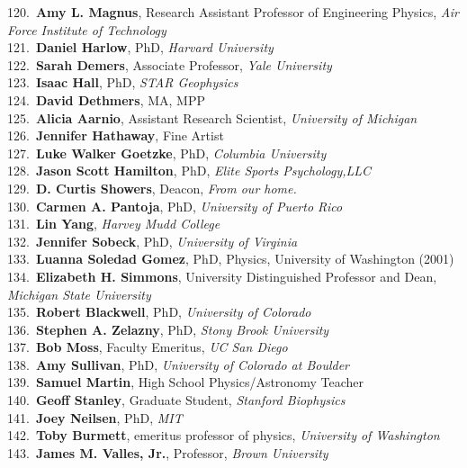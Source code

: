 120.~{\bf Amy L. Magnus}, Research Assistant Professor of Engineering Physics, {\sl Air Force Institute of Technology} \\
121.~{\bf Daniel Harlow}, PhD, {\sl Harvard University} \\
122.~{\bf Sarah Demers}, Associate Professor, {\sl Yale University} \\
123.~{\bf Isaac Hall}, PhD, {\sl STAR Geophysics} \\
124.~{\bf David Dethmers}, MA, MPP \\
125.~{\bf Alicia Aarnio}, Assistant Research Scientist, {\sl University of Michigan} \\
126.~{\bf Jennifer Hathaway}, Fine Artist \\
127.~{\bf Luke Walker Goetzke}, PhD, {\sl Columbia University} \\
128.~{\bf Jason Scott Hamilton}, PhD, {\sl Elite Sports Psychology,LLC} \\
129.~{\bf D. Curtis Showers}, Deacon, {\sl From our home.} \\
130.~{\bf Carmen A. Pantoja}, PhD, {\sl University of Puerto Rico} \\
131.~{\bf Lin Yang}, {\sl Harvey Mudd College} \\
132.~{\bf Jennifer Sobeck}, PhD, {\sl University of Virginia} \\
133.~{\bf Luanna Soledad Gomez}, PhD, Physics, University of Washington (2001) \\
134.~{\bf Elizabeth H. Simmons}, University Distinguished Professor and Dean, {\sl Michigan State University } \\
135.~{\bf Robert Blackwell}, PhD, {\sl University of Colorado} \\
136.~{\bf Stephen A. Zelazny}, PhD, {\sl Stony Brook University } \\
137.~{\bf Bob Moss}, Faculty Emeritus, {\sl UC San Diego} \\
138.~{\bf Amy Sullivan}, PhD, {\sl University of Colorado at Boulder} \\
139.~{\bf Samuel Martin}, High School Physics/Astronomy Teacher \\
140.~{\bf Geoff Stanley}, Graduate Student, {\sl Stanford Biophysics} \\
141.~{\bf Joey Neilsen}, PhD, {\sl MIT} \\
142.~{\bf Toby Burmett}, emeritus professor of physics, {\sl University of Washington} \\
143.~{\bf James M. Valles, Jr.}, Professor, {\sl Brown University} \\
